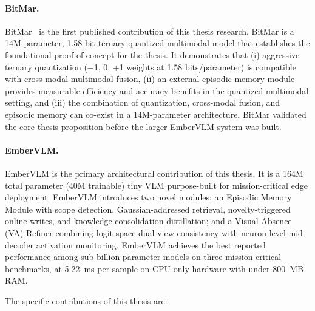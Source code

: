 \paragraph{BitMar.}
BitMar~\cite{aman2025bitmar} is the first published contribution of this thesis research. BitMar is a 14M-parameter, 1.58-bit ternary-quantized multimodal model that establishes the foundational proof-of-concept for the thesis. It demonstrates that (i) aggressive ternary quantization ({$-$1, 0, +1} weights at 1.58 bits/parameter) is compatible with cross-modal multimodal fusion, (ii) an external episodic memory module provides measurable efficiency and accuracy benefits in the quantized multimodal setting, and (iii) the combination of quantization, cross-modal fusion, and episodic memory can co-exist in a 14M-parameter architecture. BitMar validated the core thesis proposition before the larger EmberVLM system was built.

\paragraph{EmberVLM.}
EmberVLM is the primary architectural contribution of this thesis. It is a 164M total parameter (40M trainable) tiny VLM purpose-built for mission-critical edge deployment. EmberVLM introduces two novel modules: an Episodic Memory Module with scope detection, Gaussian-addressed retrieval, novelty-triggered online writes, and knowledge consolidation distillation; and a Visual Absence (VA) Refiner combining logit-space dual-view consistency with neuron-level mid-decoder activation monitoring. EmberVLM achieves the best reported performance among sub-billion-parameter models on three mission-critical benchmarks, at 5.22~ms per sample on CPU-only hardware with under 800~MB RAM.

The specific contributions of this thesis are:


